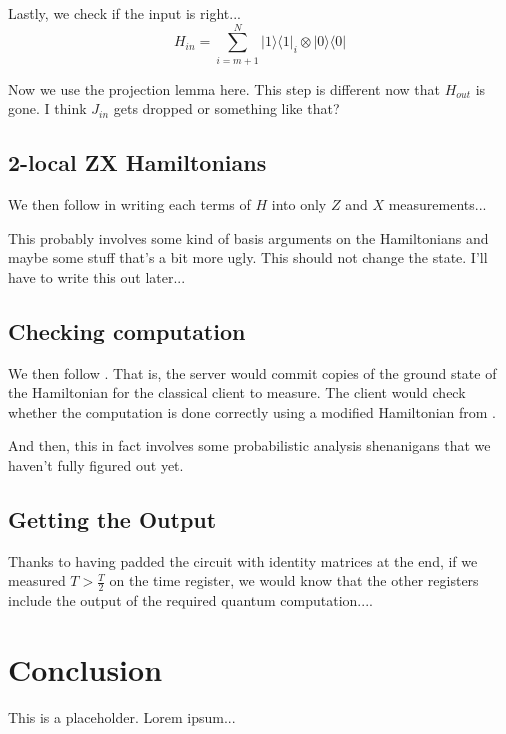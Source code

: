 \documentclass{article}
\theoremstyle{definition}
\begin{document}
Lastly, we check if the input is right...
	$$H_{in}=\sum_{i=m+1}^N|1\rangle\langle1|_i\otimes|0\rangle\langle0|$$

Now we use the projection lemma here. This step is different now that $H_{out}$ is gone. I think $J_{in}$ gets dropped or something like that?

\subsection{2-local ZX Hamiltonians}

We then follow \cite{0704.1287} in writing each terms of $H$ into only $Z$ and $X$ measurements...

This probably involves some kind of basis arguments on the Hamiltonians and maybe some stuff that's a bit more ugly. This should not change the state. I'll have to write this out later...

\subsection{Checking computation}

We then follow \cite{1804.01082}. That is, the server would commit copies of the ground state of the Hamiltonian for the classical client to measure. The client would check whether the computation is done correctly using a modified Hamiltonian from \cite{quant-ph/0406180}. 

And then, this in fact involves some probabilistic analysis shenanigans that we haven't fully figured out yet.

\subsection{Getting the Output}

Thanks to having padded the circuit with identity matrices at the end, if we measured $T>\frac{T}{2}$ on the time register, we would know that the other registers include the output of the required quantum computation....

\section{Conclusion}

This is a placeholder. Lorem ipsum...
\end{document}
